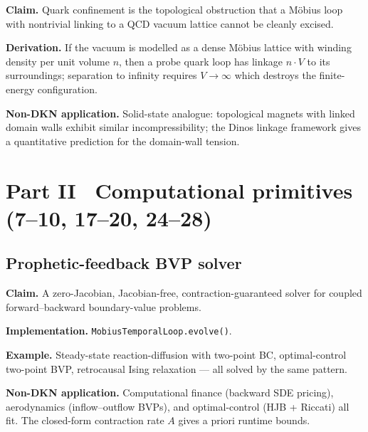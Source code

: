\documentclass[11pt,a4paper]{article}
\theoremstyle{definition}
\newcommand{\contr}{A}
\begin{document}
\begin{tcolorbox}[noveltybox]
\textbf{Claim.} Quark confinement is the topological obstruction that
a M\"obius loop with nontrivial linking to a QCD vacuum lattice cannot
be cleanly excised.
\end{tcolorbox}

\textbf{Derivation.} If the vacuum is modelled as a dense M\"obius
lattice with winding density per unit volume $n$, then a probe quark
loop has linkage $n\cdot V$ to its surroundings; separation to
infinity requires $V \to \infty$ which destroys the finite-energy
configuration.

\begin{tcolorbox}[applbox]
\textbf{Non-DKN application.}
Solid-state analogue: topological magnets with linked domain walls
exhibit similar incompressibility; the Dinos linkage framework gives
a quantitative prediction for the domain-wall tension.
\end{tcolorbox}

\section{Part II \textemdash\ Computational primitives (7--10, 17--20, 24--28)}
\label{sec:algorithms}

\subsection{Prophetic-feedback BVP solver}\label{nov:7}

\begin{tcolorbox}[noveltybox]
\textbf{Claim.} A zero-Jacobian, Jacobian-free, contraction-guaranteed
solver for coupled forward--backward boundary-value problems.
\end{tcolorbox}

\textbf{Implementation.} \texttt{MobiusTemporalLoop.evolve()}.

\textbf{Example.} Steady-state reaction-diffusion with two-point BC,
optimal-control two-point BVP, retrocausal Ising
relaxation --- all solved by the same pattern.

\begin{tcolorbox}[applbox]
\textbf{Non-DKN application.}
Computational finance (backward SDE pricing), aerodynamics (inflow--outflow
BVPs), and optimal-control (HJB + Riccati) all fit. The closed-form
contraction rate $\contr$ gives a priori runtime bounds.
\end{tcolorbox}
\end{document}
